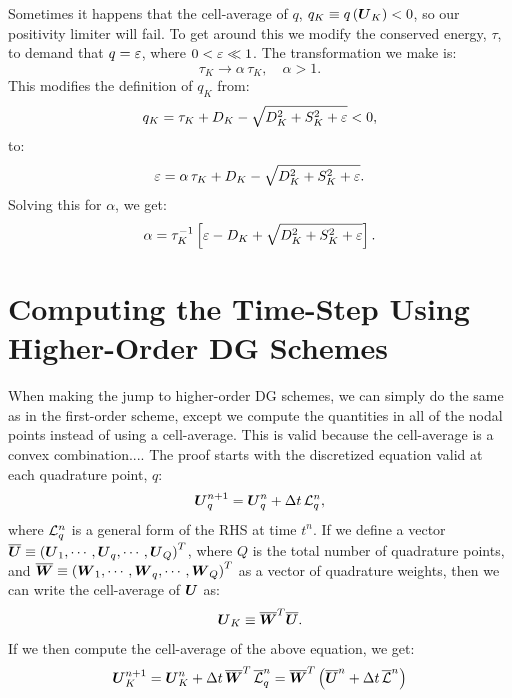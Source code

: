\documentclass[10pt,preprint]{aastex}
\begin{document}
Sometimes it happens that the cell-average of $q$, $q_{K}\equiv q\left(\boldsymbol{U}_{K}\right)<0$, so our positivity limiter will fail. To get around this we modify the conserved energy, $\tau$, to demand that $q=\varepsilon$, where $0<\varepsilon\ll1$. The transformation we make is:
\begin{equation}
   \tau_{K}\longrightarrow\alpha\,\tau_{K},\hspace{1em}\alpha>1.
\end{equation}
This modifies the definition of $q_{K}$ from:
\begin{equation}
   q_{K}=\tau_{K}+D_{K}-\sqrt{D_{K}^{2}+S_{K}^{2}+\varepsilon}<0,
\end{equation}
to:
\begin{equation}
   \varepsilon=\alpha\,\tau_{K}+D_{K}-\sqrt{D_{K}^{2}+S_{K}^{2}+\varepsilon}.
\end{equation}
Solving this for $\alpha$, we get:
\begin{equation}
   \alpha=\tau_{K}^{-1}\left[\varepsilon-D_{K}+\sqrt{D_{K}^{2}+S_{K}^{2}+\varepsilon}\right].
\end{equation}

\section{Computing the Time-Step Using Higher-Order DG Schemes}

When making the jump to higher-order DG schemes, we can simply do the same as in the first-order scheme, except we compute the quantities in all of the nodal points instead of using a cell-average. This is valid because the cell-average is a convex combination.... The proof starts with the discretized equation valid at each quadrature point, $q$:
\begin{equation}
    \boldsymbol{U}_{q}^{n+1}=\boldsymbol{U}_{q}^{n}+\Delta t\,\mathcal{L}_{q}^{n},
\end{equation}
where $\mathcal{L}_{q}^{n}$ is a general form of the RHS at time $t^{n}$. If we define a vector $\overline{\boldsymbol{U}}\equiv\left(\boldsymbol{U}_{1},\cdots,\boldsymbol{U}_{q},\cdots,\boldsymbol{U}_{Q}\right)^T$, where $Q$ is the total number of quadrature points, and $\overline{\boldsymbol{W}}\equiv\left(\boldsymbol{W}_{1},\cdots,\boldsymbol{W}_{q},\cdots,\boldsymbol{W}_{Q}\right)^T$ as a vector of quadrature weights, then we can write the cell-average of $\boldsymbol{U}$ as:
\begin{equation}
    \boldsymbol{U}_{K}\equiv\overline{\boldsymbol{W}}^T\overline{\boldsymbol{U}}.
\end{equation}
If we then compute the cell-average of the above equation, we get:
\begin{equation}
    \boldsymbol{U}_{K}^{n+1}=\boldsymbol{U}_{K}^{n}+\Delta t\,\overline{\boldsymbol{W}}^{T}\,\overline{\mathcal{L}}_{q}^{n}=\overline{\boldsymbol{W}}^{T}\left(\overline{\boldsymbol{U}}^{n}+\Delta t\,\overline{\mathcal{L}}^{n}\right)
\end{equation}
\end{document}
